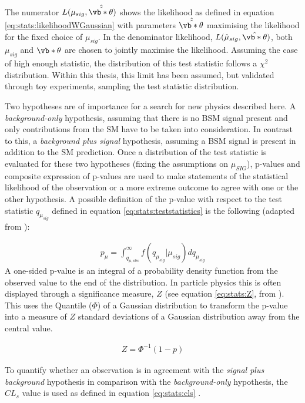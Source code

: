 The numerator $L(\mu_{sig},\hat{\hat{ \vb*{\theta}}})$ shows the likelihood as defined in equation \eqref{eq:stats:likelihoodWGaussian} with parameters $\hat{\hat{ \vb*{\theta}}}$ maximising the likelihood for the fixed choice of $\mu_{sig}$. In the denominator likelihood, $L(\hat{\mu}_{sig},\hat{ \vb*{\theta}})$,  both $\mu_{sig}$ and $ \vb*{\theta}$ are chosen to jointly maximise the likelihood.
Assuming the case of high enough statistic,  the distribution of this test statistic follows a $\chi^2$ distribution.  Within this thesis,  this limit has been assumed,  but validated through toy experiments, sampling the test statistic distribution. 

Two hypotheses are of importance for a search for new physics described here.  A \textit{background-only} hypothesis,  assuming that there is no \ac{BSM} signal present and only contributions from the \ac{SM} have to be taken into consideration.  In contrast to this,  a \textit{background plus signal} hypothesis,  assuming a \ac{BSM} signal is present in addition to the \ac{SM} prediction.
Once a distribution of the test statistic is evaluated for these two hypotheses (fixing the assumptions on $\mu_{SIG}$),  p-values and composite expression of p-values are used to make statements of the statistical likelihood of the observation or a more extreme outcome to agree with one or the other hypothesis. 
A possible definition of the p-value with respect to the test statistic $q_{\mu_{sig}}$ defined in equation \eqref{eq:stats:teststatistics} is the following (adapted from \cite{CLs}):

\begin{align}
p_\mu = \int_{q_{\mu,obs}}^{\infty} f(q_{\mu_{sig}} | \mu_{sig}) dq_{\mu_{sig}}
\end{align}
A one-sided p-value is an integral of a probability density function from the observed value to the end of the distribution.  In particle physics this is often displayed through a significance measure,  $Z$ (see equation \eqref{eq:stats:Z}, from \cite{TestStatistics}).  This uses the Quantile ($\Phi$) of a Gaussian distribution to transform the p-value into a measure of $Z$ standard deviations of a Gaussian distribution away from the central value.

\begin{align}
Z  =  \Phi^{-1}(1-p) \label{eq:stats:Z}
\end{align}

To quantify whether an observation is in agreement with the \textit{signal plus background} hypothesis in comparison with the \textit{background-only} hypothesis,  the $CL_s$ value is used as defined in equation \eqref{eq:stats:cls} \cite{CLs}. 


